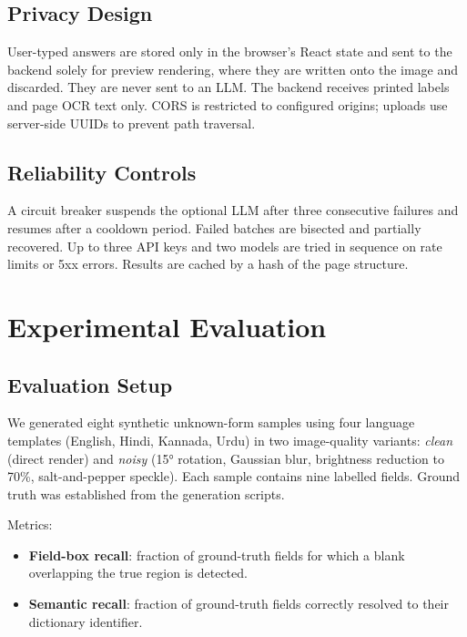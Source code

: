 \documentclass[conference]{IEEEtran}
\begin{document}
\subsection{Privacy Design}

User-typed answers are stored only in the browser's React state and sent to the backend solely for preview rendering, where they are written onto the image and discarded. They are never sent to an LLM. The backend receives printed labels and page OCR text only. CORS is restricted to configured origins; uploads use server-side UUIDs to prevent path traversal.

\subsection{Reliability Controls}

A circuit breaker suspends the optional LLM after three consecutive failures and resumes after a cooldown period. Failed batches are bisected and partially recovered. Up to three API keys and two models are tried in sequence on rate limits or 5xx errors. Results are cached by a hash of the page structure.

\section{Experimental Evaluation}
\label{sec:evaluation}

\subsection{Evaluation Setup}

We generated eight synthetic unknown-form samples using four language templates (English, Hindi, Kannada, Urdu) in two image-quality variants: \textit{clean} (direct render) and \textit{noisy} (15° rotation, Gaussian blur, brightness reduction to 70\%, salt-and-pepper speckle). Each sample contains nine labelled fields. Ground truth was established from the generation scripts.

Metrics:
\begin{itemize}
  \item \textbf{Field-box recall}: fraction of ground-truth fields for which a blank overlapping the true region is detected.
  \item \textbf{Semantic recall}: fraction of ground-truth fields correctly resolved to their dictionary identifier.
\end{itemize}
\end{document}
